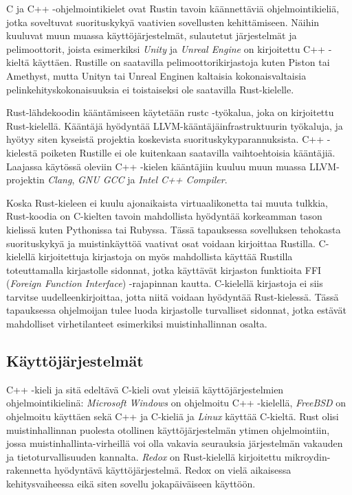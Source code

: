 \documentclass[finnish]{tktltiki2}
\theoremstyle{definition}
\theoremstyle{remark}
\begin{document}
C ja C++ -ohjelmointikielet ovat Rustin tavoin käännettäviä ohjelmointikieliä, jotka soveltuvat suorituskykyä vaativien sovellusten kehittämiseen. Näihin kuuluvat muun muassa käyttöjärjestelmät, sulautetut järjestelmät ja pelimoottorit, joista esimerkiksi \textit{Unity} ja \textit{Unreal Engine} on kirjoitettu C++ -kieltä käyttäen. Rustille on saatavilla pelimoottorikirjastoja kuten Piston tai Amethyst, mutta Unityn tai Unreal Enginen kaltaisia kokonaisvaltaisia pelinkehityskokonaisuuksia ei toistaiseksi ole saatavilla Rust-kielelle.\cite{AreWeGameYetEngines}

Rust-lähdekoodin kääntämiseen käytetään rustc -työkalua, joka on kirjoitettu Rust-kielellä. Kääntäjä hyödyntää LLVM-kääntäjäinfrastruktuurin työkaluja, ja hyötyy siten kyseistä projektia koskevista suorituskykyparannuksista. \cite{HowFastIsRust} C++ -kielestä poiketen Rustille ei ole kuitenkaan saatavilla vaihtoehtoisia kääntäjiä. Laajassa käytössä oleviin C++ -kielen kääntäjiin kuuluu muun muassa LLVM-projektin \textit{Clang}, \textit{GNU GCC} ja \textit{Intel C++ Compiler}.

Koska Rust-kieleen ei kuulu ajonaikaista virtuaalikonetta tai muuta tulkkia, Rust-koodia on C-kielten tavoin mahdollista hyödyntää korkeamman tason kielissä kuten Pythonissa tai Rubyssa. Tässä tapauksessa sovelluksen tehokasta suorituskykyä ja muistinkäyttöä vaativat osat voidaan kirjoittaa Rustilla.\cite{RustInsideOtherLanguages} C-kielellä kirjoitettuja kirjastoja on myös mahdollista käyttää Rustilla toteuttamalla kirjastolle sidonnat, jotka käyttävät kirjaston funktioita FFI (\textit{Foreign Function Interface}) -rajapinnan kautta. C-kielellä kirjastoja ei siis tarvitse uudelleenkirjoittaa, jotta niitä voidaan hyödyntää Rust-kielessä. Tässä tapauksessa ohjelmoijan tulee luoda kirjastolle turvalliset sidonnat, jotka estävät mahdolliset virhetilanteet esimerkiksi muistinhallinnan osalta.

\subsection{Käyttöjärjestelmät}

C++ -kieli ja sitä edeltävä C-kieli ovat yleisiä käyttöjärjestelmien ohjelmointikielinä: \textit{Microsoft Windows} on ohjelmoitu C++ -kielellä, \textit{FreeBSD} on ohjelmoitu käyttäen sekä C++ ja C-kieliä ja \textit{Linux} käyttää C-kieltä. Rust olisi muistinhallinnan puolesta otollinen käyttöjärjestelmän ytimen ohjelmointiin, jossa muistinhallinta-virheillä voi olla vakavia seurauksia järjestelmän vakauden ja tietoturvallisuuden kannalta. \textit{Redox} on Rust-kielellä kirjoitettu mikroydin-rakennetta hyödyntävä käyttöjärjestelmä.\cite{WhatRedoxIs} Redox on vielä aikaisessa kehitysvaiheessa eikä siten sovellu jokapäiväiseen käyttöön.
\end{document}
